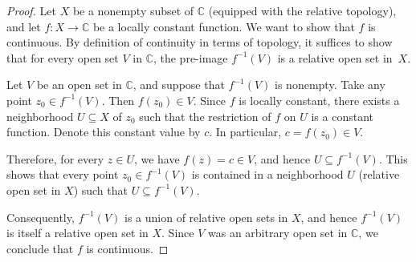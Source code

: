 \begin{proof}
	Let $X$ be a nonempty subset of $\mathbb{C}$ (equipped with the relative topology), and let
	$f:X\rightarrow\mathbb{C}$ be a locally constant function. We want to show that $f$ is 	continuous.	
	By definition of continuity in terms of topology, it suffices to show that for every open set
	$V$ in $\mathbb{C}$, the pre-image $f^{-1}(V)$ is a relative open set in~$X$.
	
	Let $V$ be an open set in $\mathbb{C}$, and suppose that $f^{-1}(V)$ is nonempty. Take any
	point $z_0 \in f^{-1}(V)$. Then $f(z_0) \in V$. Since $f$ is locally constant, there exists a
	neighborhood $U \subseteq X$ of $z_0$ such that the restriction of $f$ on $U$ is a constant
	function. Denote this constant value by $c$. In particular, $c = f(z_0) \in V$.
	
	Therefore, for every $z \in U$, we have $f(z) = c \in V$, and hence $U \subseteq f^{-1}(V)$.
	This shows that every point $z_0 \in f^{-1}(V)$ is contained in a neighborhood $U$ (relative
	open set in $X$) such that $U \subseteq f^{-1}(V)$.
	
	Consequently, $f^{-1}(V)$ is a union of relative open sets in $X$, and hence $f^{-1}(V)$ is
	itself a relative open set in $X$. Since $V$ was an arbitrary open set in $\mathbb{C}$, we
	conclude that $f$ is continuous.
\end{proof}





